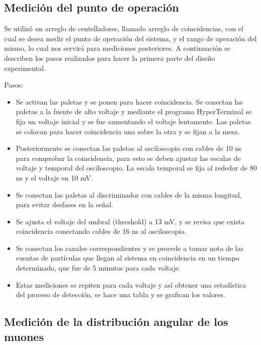 \documentclass[a4paper,10pt]{article}
\numberwithin{equation}{section}
\begin{document}
\subsection{Medición del punto de operación}
\label{ss:medicionoperacion}

Se utilizó un arreglo de centelladores, llamado arreglo de coincidencias, con el cual se desea medir el punto de operación del sistema, y el rango de operación del mismo, 
lo cual nos servirá para mediciones posteriores. A continuación se describen los 
pasos realizados para hacer la primera parte del diseño experimental.

\vspace{.3cm}

Pasos:

\begin{itemize}
 \item Se activan las paletas y se ponen para hacer coincidencia. Se conectan las paletas a la fuente de alto voltaje y 
 mediante el programa HyperTerminal se fija un voltaje inicial y se fue aumentando el voltaje lentamente. Las paletas 
 se colocan para hacer coincidencia una sobre la otra y se fijan a la mesa.
 \item Posteriormente se conectan las paletas al osciloscopio con cables de 10 ns  para comprobar la coincidencia, para esto se deben ajustar 
 las escalas de voltaje y temporal del osciloscopio. La escala temporal se fija al rededor de 80 ns y 
 el voltaje en 10 mV.
 \item Se conectan las paletas al discriminador con cables de la misma longitud, para evitar desfases en la señal.
 \item Se ajusta el voltaje del umbral (threshold) a 13 mV, y se revisa que exista coincidencia conectando cables de 
 16 ns al osciloscopio.
 \item Se conectan los canales correspondientes y se procede a tomar nota de las cuentas de partículas que llegan al sistema
 en coincidencia en un tiempo determinado, que fue de 5 minutos para cada voltaje.
 \item Estas mediciones se repiten para cada voltaje y así obtener una estadística del proceso de detección, se hace una tabla y 
 se grafican los valores.
\end{itemize}


\subsection{Medición de la distribución angular de los muones}
\label{ss:medicionangulos}
\end{document}
